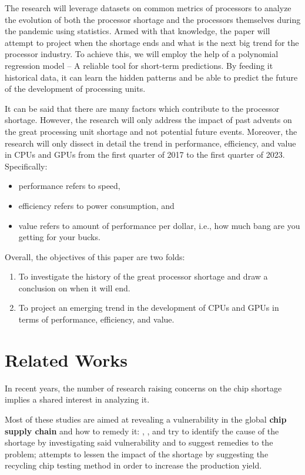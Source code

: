 \documentclass[conference]{IEEEtran}
\begin{document}
The research will leverage datasets on common metrics of processors to
analyze the evolution of both the processor shortage and the processors
themselves during the pandemic using statistics. Armed with that knowledge,
the paper will attempt to project when the shortage ends and what is the
next big trend for the processor industry. To achieve this, we will employ
the help of a polynomial regression model -- A reliable tool for short-term
predictions. By feeding it historical data, it can learn the hidden
patterns and be able to predict the future of the development of
processing units.

It can be said that there are many factors which contribute to the
processor shortage. However, the research will only
address the impact of past advents on the great processing unit
shortage and not potential future events. Moreover, the research will only
dissect in detail the trend in
performance, efficiency, and value in CPUs and GPUs from the first quarter of
2017 to the first quarter of 2023. Specifically:
\begin{itemize}
	\item performance refers to speed,
	\item efficiency refers to power consumption, and
	\item value refers to amount of performance per dollar, i.e.,
	      how much bang are you getting for your bucks.
\end{itemize}

Overall, the objectives of this paper are two folds:
\begin{enumerate}
	\item To investigate the history of the great processor shortage and draw a
	      conclusion on when it will end.
	\item To project an emerging trend in the development of CPUs and GPUs in
	      terms of performance, efficiency, and value.
\end{enumerate}

\section{Related Works}\label{RelatedWorks}
In recent years, the number of research raising concerns on the chip
shortage implies a shared interest in analyzing it.

Most of these studies are aimed at revealing a vulnerability in the
global \textbf{chip supply chain} and how to remedy it: \cite{Hannah:2021},
\cite{Xiling:2021}, and \cite{Wassen:2022} try to identify the cause
of the shortage by investigating said vulnerability and to suggest
remedies to the problem; \cite{Yeh:2022} attempts to lessen the impact of
the shortage by suggesting the recycling chip testing method in order to
increase the production yield.
\end{document}
